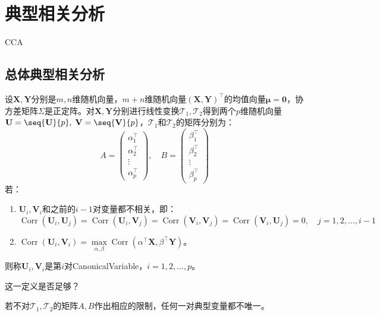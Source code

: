 \section{典型相关分析}
\gls{CCA}
\subsection{总体典型相关分析}
\begin{definition}
	设$\mathbf{X},\mathbf{Y}$分别是$m,n$维随机向量，$m+n$维随机向量$(\mathbf{X},\mathbf{Y})^{\top}$的均值向量$\boldsymbol{\mu}=\mathbf{0}$，协方差矩阵$\Sigma$是正定阵。对$\mathbf{X},\mathbf{Y}$分别进行线性变换$\mathcal{T}_1,\mathcal{T}_2$得到两个$p$维随机向量$\mathbf{U}=\seq{\mathbf{U}}{p},\;\mathbf{V}=\seq{\mathbf{V}}{p}$，$\mathcal{T}_1$和$\mathcal{T}_2$的矩阵分别为：
	\begin{equation*}
		A=
		\begin{pmatrix}
			\alpha_1^{\top} \\
			\alpha_2^{\top} \\
			\vdots \\
			\alpha_p^{\top}
		\end{pmatrix},\quad
		B=
		\begin{pmatrix}
			\beta_1^{\top} \\
			\beta_2^{\top} \\
			\vdots \\
			\beta_p^{\top}
		\end{pmatrix}
	\end{equation*}
	若：
	\begin{enumerate}
		\item $\mathbf{U}_i,\mathbf{V}_i$和之前的$i-1$对变量都不相关，即：
		\begin{equation*}
			\operatorname{Corr}(\mathbf{U}_i,\mathbf{U}_j)=\operatorname{Corr}(\mathbf{U}_i,\mathbf{V}_j)=\operatorname{Corr}(\mathbf{V}_i,\mathbf{V}_j)=\operatorname{Corr}(\mathbf{V}_i,\mathbf{U}_j)=0,\quad j=1,2,\dots,i-1
		\end{equation*}
		\item $\operatorname{Corr}(\mathbf{U}_i,\mathbf{V}_i)=\max\limits_{\alpha,\beta}\operatorname{Corr}(\alpha^{\top}\mathbf{X},\beta^{\top}\mathbf{Y})$。
	\end{enumerate}
	则称$\mathbf{U}_i,\mathbf{V}_i$是第$i$对\gls{CanonicalVariable}，$i=1,2,\dots,p$。
\end{definition}
这一定义是否足够？
\begin{theorem}
	若不对$\mathcal{T}_1,\mathcal{T}_2$的矩阵$A,B$作出相应的限制，任何一对典型变量都不唯一。
\end{theorem}

